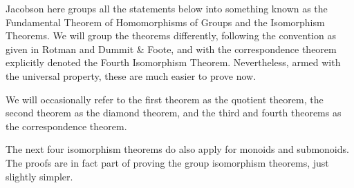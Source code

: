 \begin{remark}\label{rmk:iso-numbering}
    Jacobson here groups all the statements below into something
    known as the Fundamental Theorem of Homomorphisms of Groups
    and the Isomorphism Theorems.
    We will group the theorems differently,
    following the convention as given in Rotman and Dummit \& Foote,
    and with the correspondence theorem explicitly denoted the Fourth Isomorphism Theorem.
    Nevertheless, armed with the universal property,
    these are much easier to prove now.

    We will occasionally refer to
    the first theorem as the quotient theorem,
    the second theorem as the diamond theorem,
    and the third and fourth theorems as the correspondence theorem.
\end{remark}
\begin{remark}
    The next four isomorphism theorems do also apply for monoids and submonoids.
    The proofs are in fact part of proving the group isomorphism theorems,
    just slightly simpler.
\end{remark}


